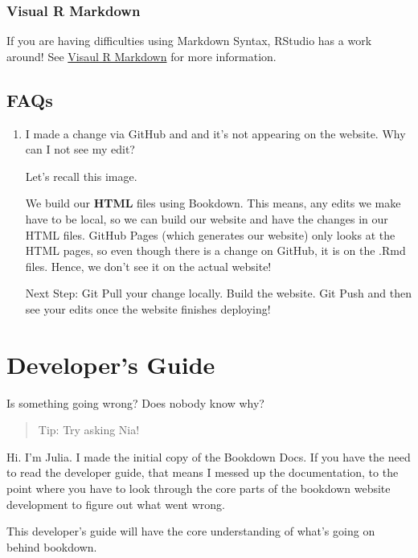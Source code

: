 \documentclass[
]{book}
\theoremstyle{definition}
\theoremstyle{definition}
\theoremstyle{definition}
\theoremstyle{definition}
\theoremstyle{remark}
\begin{document}
\subsection{Visual R Markdown}\label{visual-r-markdown}

If you are having difficulties using Markdown Syntax, RStudio has a work around! See \hyperref[visual-r-md]{Visaul R Markdown} for more information.

\section{FAQs}\label{faqs}

\begin{enumerate}
\def\labelenumi{\arabic{enumi}.}
\item
  I made a change via GitHub and and it's not appearing on the website. Why can I not see my edit?

  Let's recall this image.

  We build our \textbf{HTML} files using Bookdown. This means, any edits we make have to be local, so we can build our website and have the changes in our HTML files. GitHub Pages (which generates our website) only looks at the HTML pages, so even though there is a change on GitHub, it is on the .Rmd files. Hence, we don't see it on the actual website!

  Next Step: Git Pull your change locally. Build the website. Git Push and then see your edits once the website finishes deploying!
\end{enumerate}

\chapter{Developer's Guide}\label{developers-guide}

Is something going wrong? Does nobody know why?

\begin{quote}
Tip: Try asking Nia!
\end{quote}

Hi. I'm Julia. I made the initial copy of the Bookdown Docs. If you have the need to read the developer guide, that means I messed up the documentation, to the point where you have to look through the core parts of the bookdown website development to figure out what went wrong.

This developer's guide will have the core understanding of what's going on behind bookdown.
\end{document}
